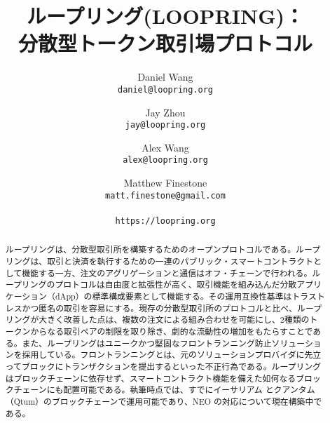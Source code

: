 \documentclass{article}
\title{
{ループリング(LOOPRING)：}\\\textbf{分散型トークン取引場プロトコル}}
\author{
  Daniel Wang\\
  \texttt{daniel@loopring.org}\\
  \and
  	Jay Zhou\\
  	\texttt{jay@loopring.org}\\
  	\and
  	Alex Wang\\
  	\texttt{alex@loopring.org}\\
  	\and
  	Matthew Finestone\\
  	\texttt{matt.finestone@gmail.com}\\ 
  \\
  \texttt{https://loopring.org}
 }
\begin{document}
\maketitle

\begin{abstract}
ループリングは、分散型取引所を構築するためのオープンプロトコルである。ループリングは、取引と決済を執行するための一連のパブリック・スマートコントラクトとして機能する一方、注文のアグリゲーションと通信はオフ・チェーンで行われる。ループリングのプロトコルは自由度と拡張性が高く、取引機能を組み込んだ分散アプリケーション（dApp）の標準構成要素として機能する。その運用互換性基準はトラストレスかつ匿名の取引を容易にする。現存の分散型取引所のプロトコルと比べ、ループリングが大きく改善した点は、複数の注文による組み合わせを可能にし、2種類のトークンからなる取引ペアの制限を取り除き、劇的な流動性の増加をもたらすことである。また、ループリングはユニークかつ堅固なフロントランニング防止ソリューションを採用している。フロントランニングとは、元のソリューションプロバイダに先立ってブロックにトランザクションを提出するといった不正行為である。ループリングはブロックチェーンに依存せず、スマートコントラクト機能を備えた如何なるブロックチェーンにも配置可能である。執筆時点では、すでにイーサリアム \cite{buterin2017ethereum} \cite{wood2014ethereum}とクアンタム（Qtum）\cite{dai2017smart}のブロックチェーンで運用可能であり、NEO \cite{atterlonn2018distributed}の対応について現在構築中である。
\end{abstract}
\end{document}
